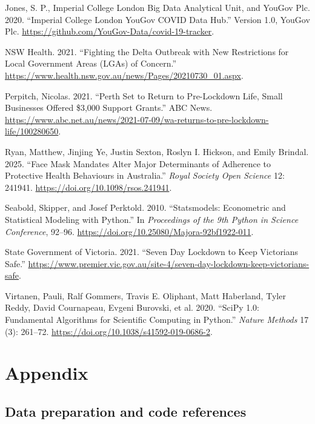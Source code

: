 \documentclass[
  12pt,
  a4paper,
]{article}
\newlength{\cslhangindent}
\newenvironment{CSLReferences}[2] %
 {\begin{list}{}{%
  \setlength{\itemindent}{0pt}
  \setlength{\leftmargin}{0pt}
  \setlength{\parsep}{0pt}
  \ifodd #1
   \setlength{\leftmargin}{\cslhangindent}
   \setlength{\itemindent}{-1\cslhangindent}
  \fi
  \setlength{\itemsep}{#2\baselineskip}}}
 {\end{list}}
\begin{document}
\begin{CSLReferences}{1}{0}
Jones, S. P., Imperial College London Big Data Analytical Unit, and YouGov Plc. 2020. {``Imperial College London YouGov COVID Data Hub.''} Version 1.0, YouGov Plc. \url{https://github.com/YouGov-Data/covid-19-tracker}.

NSW Health. 2021. {``Fighting the Delta Outbreak with New Restrictions for Local Government Areas (LGAs) of Concern.''} \url{https://www.health.nsw.gov.au/news/Pages/20210730_01.aspx}.

Perpitch, Nicolas. 2021. {``Perth Set to Return to Pre-Lockdown Life, Small Businesses Offered \$3,000 Support Grants.''} ABC News. \url{https://www.abc.net.au/news/2021-07-09/wa-returns-to-pre-lockdown-life/100280650}.

Ryan, Matthew, Jinjing Ye, Justin Sexton, Roslyn I. Hickson, and Emily Brindal. 2025. {``Face Mask Mandates Alter Major Determinants of Adherence to Protective Health Behaviours in Australia.''} \emph{Royal Society Open Science} 12: 241941. \url{https://doi.org/10.1098/rsos.241941}.

Seabold, Skipper, and Josef Perktold. 2010. {``Statsmodels: Econometric and Statistical Modeling with Python.''} In \emph{Proceedings of the 9th Python in Science Conference}, 92--96. \url{https://doi.org/10.25080/Majora-92bf1922-011}.

State Government of Victoria. 2021. {``Seven Day Lockdown to Keep Victorians Safe.''} \url{https://www.premier.vic.gov.au/site-4/seven-day-lockdown-keep-victorians-safe}.

Virtanen, Pauli, Ralf Gommers, Travis E. Oliphant, Matt Haberland, Tyler Reddy, David Cournapeau, Evgeni Burovski, et al. 2020. {``SciPy 1.0: Fundamental Algorithms for Scientific Computing in Python.''} \emph{Nature Methods} 17 (3): 261--72. \url{https://doi.org/10.1038/s41592-019-0686-2}.

\end{CSLReferences}

\clearpage

\section{Appendix}\label{appendix}

\subsection{Data preparation and code references}\label{data-preparation-and-code-references}
\end{document}

